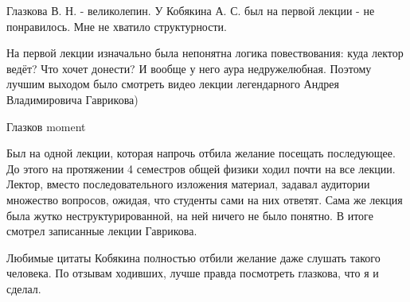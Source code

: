                 \begin{commentbox} 
                    Глазкова В. Н. - великолепин. 
                    У Кобякина А. С. был на первой лекции - не понравилось. Мне не хватило структурности. 
                \end{commentbox} 
            
                \begin{commentbox} 
                    На первой лекции изначально была непонятна логика повествования: куда лектор ведёт? Что хочет донести? И вообще у него аура недружелюбная. Поэтому лучшим выходом было смотреть видео лекции легендарного Андрея Владимировича Гаврикова) 
                \end{commentbox} 

                \begin{commentbox} 
                    Глазков moment 
                \end{commentbox} 
            
                \begin{commentbox} 
                    Был на одной лекции, которая напрочь отбила желание посещать последующее. До этого на протяжении 4 семестров общей физики ходил почти на все лекции. Лектор, вместо последовательного изложения материал, задавал аудитории множество вопросов, ожидая, что студенты сами на них ответят. Сама же лекция была жутко неструктурированной, на ней ничего не было понятно. В итоге смотрел записанные лекции Гаврикова. 
                \end{commentbox} 
            
                \begin{commentbox} 
                    Любимые цитаты Кобякина полностью отбили желание даже слушать такого человека. По отзывам ходивших, лучше правда посмотреть глазкова, что я и сделал. 
                \end{commentbox} 
        
        
